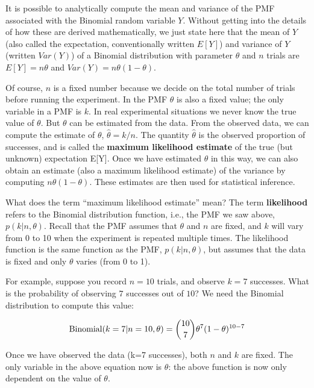 \documentclass[12pt,]{krantz}
\theoremstyle{definition}
\theoremstyle{definition}
\theoremstyle{definition}
\theoremstyle{remark}
\begin{document}
It is possible to analytically compute the mean and variance of the PMF associated with the Binomial random variable \(Y\). Without getting into the details of how these are derived mathematically, we just state here that the mean of \(Y\) (also called the expectation, conventionally written \(E[Y]\)) and variance of \(Y\) (written \(Var(Y)\)) of a Binomial distribution with parameter \(\theta\) and \(n\) trials are \(E[Y] = n\theta\) and \(Var(Y) = n\theta (1-\theta)\).

Of course, \(n\) is a fixed number because we decide on the total number of trials before running the experiment. In the PMF \(\theta\) is also a fixed value; the only variable in a PMF is \(k\). In real experimental situations we never know the true value of \(\theta\). But \(\theta\) can be estimated from the data. From the observed data, we can compute the estimate of \(\theta\), \(\hat \theta=k/n\). The quantity \(\hat \theta\) is the observed proportion of successes, and is called the \textbf{maximum likelihood estimate} of the true (but unknown) expectation E{[}Y{]}. Once we have estimated \(\theta\) in this way, we can also obtain an estimate (also a maximum likelihood estimate) of the variance by computing \(n\theta (1-\theta)\). These estimates are then used for statistical inference.

What does the term ``maximum likelihood estimate'' mean? The term \textbf{likelihood} refers to the Binomial distribution function, i.e., the PMF we saw above, \(p(k|n,\theta)\). Recall that the PMF assumes that \(\theta\) and \(n\) are fixed, and \(k\) will vary from 0 to 10 when the experiment is repeated multiple times. The likelihood function is the same function as the PMF, \(p(k|n,\theta)\), but assumes that the data is fixed and only \(\theta\) varies (from 0 to 1).

For example, suppose you record \(n=10\) trials, and observe \(k=7\) successes. What is the probability of observing \(7\) successes out of \(10\)? We need the Binomial distribution to compute this value:

\begin{equation}
\hbox{Binomial}(k=7|n=10,\theta) = 
\binom{10}{7} \theta^{7} (1-\theta)^{10-7}
\end{equation}

Once we have observed the data (k=7 successes), both \(n\) and \(k\) are fixed. The only variable in the above equation now is \(\theta\): the above function is now only dependent on the value of \(\theta\).
\end{document}

